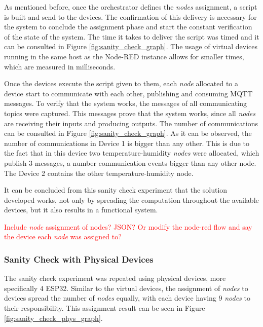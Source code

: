 As mentioned before, once the orchestrator defines the \textit{nodes} assignment, a script is built and send to the devices. The confirmation of this delivery is necessary for the system to conclude the assignment phase and start the constant verification of the state of the system. The time it takes to deliver the script was timed and it can be consulted in Figure \ref{fig:sanity_check_graph}. The usage of virtual devices running in the same host as the Node-RED instance allows for smaller times, which are measured in milliseconds.

Once the devices execute the script given to them, each \textit{node} allocated to a device start to communicate with each other, publishing and consuming MQTT messages. To verify that the system works, the messages of all communicating topics were captured. This messages prove that the system works, since all \textit{nodes} are receiving their inputs and producing outputs. The number of communications can be consulted in Figure \ref{fig:sanity_check_graph}. As it can be observed, the number of communications in Device 1 is bigger than any other. This is due to the fact that in this device two temperature-humidity \textit{nodes} were allocated, which publish 3 messages, a number communication events bigger than any other node. The Device 2 contains the other temperature-humidity node.

It can be concluded from this sanity check experiment that the solution developed works, not only by spreading the computation throughout the available devices, but it also results in a functional system.

\textcolor{red}{Include \textit{node} assignment of nodes? JSON? Or modify the node-red flow and say the device each \textit{node} was assigned to?}



\subsubsection{Sanity Check with Physical Devices}\label{sec:sanity_check_phys_exp}

The sanity check experiment was repeated using physical devices, more specifically 4 ESP32. Similar to the virtual devices, the assignment of \textit{nodes} to devices spread the number of \textit{nodes} equally, with each device having 9 \textit{nodes} to their responsibility. This assignment result can be seen in Figure \ref{fig:sanity_check_phys_graph}.

